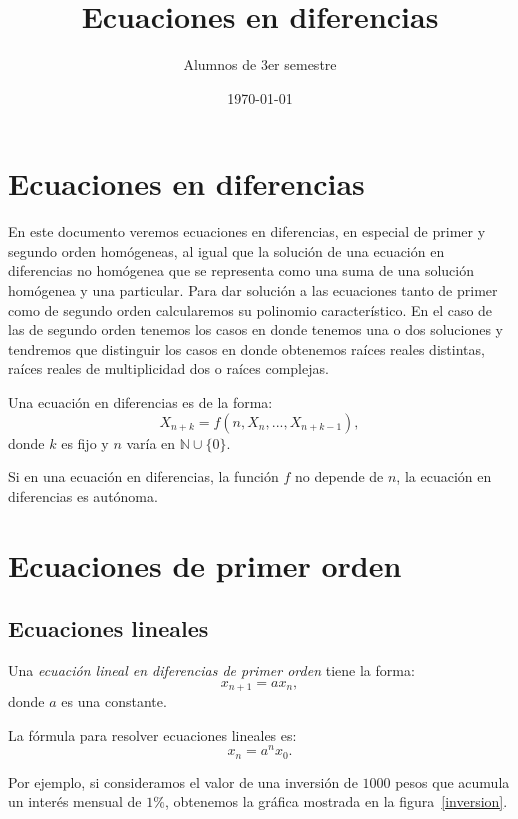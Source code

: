 \documentclass{report}
\title{Ecuaciones en diferencias}
\author{Alumnos de 3er semestre}
\date{\today}
\begin{document}
\maketitle
\tableofcontents

\chapter{Ecuaciones en diferencias}
\label{sec:ecuaciones}

En este documento veremos ecuaciones en diferencias, en especial de
primer y segundo orden homógeneas, al igual que la solución de una
ecuación en diferencias no homógenea que se representa como una suma
de una solución homógenea y una particular. Para dar solución a las
ecuaciones tanto de primer como de segundo orden calcularemos su
polinomio característico. En el caso de las de segundo orden tenemos
los casos en donde tenemos una o dos soluciones y tendremos que
distinguir los casos en donde obtenemos raíces reales distintas,
raíces reales de multiplicidad dos o raíces complejas.

Una ecuación en diferencias es de la forma:
$$X_{n+k}=f(n,X_n,...,X_{n+k-1}),$$
donde $k$ es fijo y $n$ varía en $\mathbb{N}\cup\{0\}$.

Si en una ecuación en diferencias, la función $f$ no depende de $n$,
la ecuación en diferencias es autónoma.

\chapter{Ecuaciones de primer orden}

\section{Ecuaciones lineales}

Una \emph{ecuación lineal en diferencias de primer orden} tiene la forma:
\begin{equation}
  \label{lineal}
  x_{n+1}=ax_n,
\end{equation}
donde $a$ es una constante.

La fórmula para resolver ecuaciones lineales es:
\begin{equation}
  \label{lineal}
  x_n=a^nx_0.
\end{equation}

Por ejemplo, si consideramos el valor de una inversión de $1000$ pesos
que acumula un interés mensual de $1\%$, obtenemos la gráfica mostrada
en la figura~\ref{inversion}.
\end{document}
